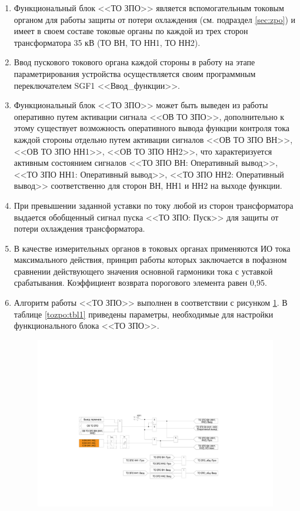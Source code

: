 \documentclass[a4paper, 12pt,table, hidelinks, DIV=calc]{extarticle} %
\begin{document}
\begin{enumerate}[label=\arabic{section}.\arabic{subsection}.\arabic*, labelsep=4pt, leftmargin=0pt, itemindent=57pt]

\item
Функциональный блок <<ТО ЗПО>> является вспомогательным токовым органом для работы защиты от потери охлаждения (см. подраздел \ref{sec:zpo}) и имеет в своем составе токовые органы по каждой из трех сторон трансформатора 35 кВ (ТО ВН, ТО НН1, ТО НН2).
\item
Ввод пускового токового органа каждой стороны в работу на этапе параметрирования устройства осуществляется своим программным переключателем SGF1 <<Ввод\_функции>>.
\item
Функциональный блок <<ТО ЗПО>> может быть выведен из работы оперативно путем активации сигнала <<ОВ ТО ЗПО>>, дополнительно к этому существует возможность оперативного вывода функции контроля тока каждой стороны отдельно путем активации сигналов <<ОВ ТО ЗПО ВН>>, <<ОВ ТО ЗПО НН1>>, <<ОВ ТО ЗПО НН2>>, что характеризуется активным состоянием сигналов <<ТО ЗПО ВН: Оперативный вывод>>, <<ТО ЗПО НН1: Оперативный вывод>>, <<ТО ЗПО НН2: Оперативный вывод>> соответственно для сторон ВН, НН1 и НН2 на выходе функции.
\item
При превышении заданной уставки по току любой из сторон трансформатора выдается обобщенный сигнал пуска <<ТО ЗПО: Пуск>> для защиты от потери охлаждения трансформатора.
\item
В качестве измерительных органов в токовых органах применяются ИО тока максимального действия, принцип работы которых заключается в пофазном сравнении действующего значения основной гармоники тока с уставкой срабатывания. Коэффициент возврата порогового элемента равен 0,95.
\item
Алгоритм работы <<ТО ЗПО>> выполнен в соответствии с рисунком \ref{tozpo:img1}. В таблице \ref{tozpo:tbl1} приведены параметры, необходимые для настройки функционального блока <<ТО ЗПО>>.

\vspace{3mm}
\begin{figure}[!h]
\centering
\includegraphics[width=1\textwidth,height=1\textheight,keepaspectratio]{img15.pdf}
\label{tozpo:img1}
\end{figure}


\end{enumerate}
\end{document}
